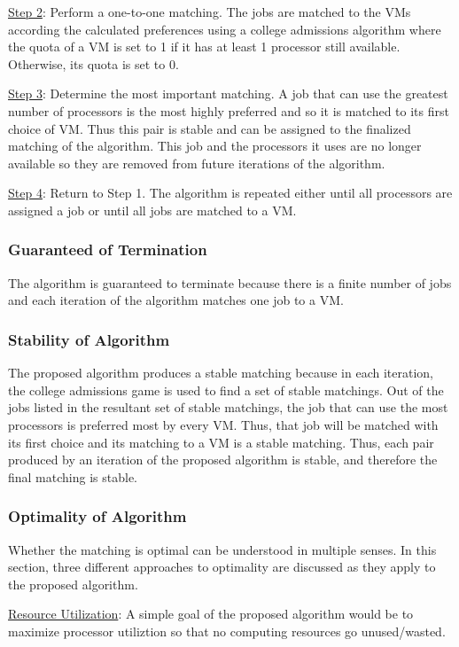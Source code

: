 \documentclass[conference]{IEEEtran}
\begin{document}
\underline{Step 2}: Perform a one-to-one matching.
The jobs are matched to the VMs according the calculated preferences
using a college admissions algorithm where the quota of a VM is 
set to 1 if it has at least 1 processor still available. 
Otherwise, its quota is set to 0.

\underline{Step 3}: Determine the most important matching.
A job that can use the greatest number of processors is the
most highly preferred and so it is matched to its first choice
of VM. Thus this pair is stable and can be assigned to 
the finalized matching of the algorithm. 
This job and the processors it uses are no longer available
so they are removed from future iterations of the algorithm.

\underline{Step 4}: Return to Step 1.
The algorithm is repeated either until all processors are 
assigned a job or until all jobs are matched 
to a VM.

\subsubsection{Guaranteed of Termination}
The algorithm is guaranteed to terminate because there is a 
finite number of jobs and each iteration of the algorithm
matches one job to a VM.

\subsubsection{Stability of Algorithm}
The proposed algorithm produces a stable matching because in
each iteration, the college admissions game is used to find
a set of stable matchings.
Out of the jobs listed in the resultant set of stable matchings,
the job that can use the most processors is preferred most
by every VM. Thus, that job will be matched with its first 
choice and its matching to a VM is a stable matching.
Thus, each pair produced by an iteration of the proposed
algorithm is stable, and therefore the final matching is stable.

\subsubsection{Optimality of Algorithm}
Whether the matching is optimal can be understood in multiple senses.
In this section, three different approaches to optimality are 
discussed as they apply to the proposed algorithm.

\underline{Resource Utilization}:
A simple goal of the proposed algorithm would be to 
maximize processor utiliztion so that no computing 
resources go unused/wasted.
\end{document}
